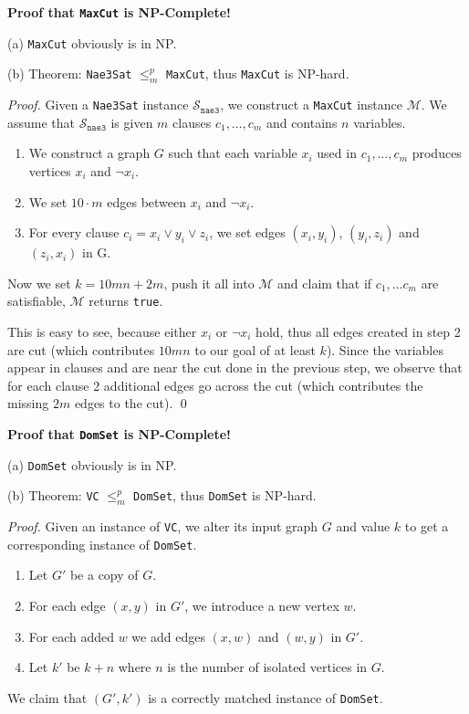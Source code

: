 \documentclass[12pt]{article}
\newcommand{\polyreduce}{$\leq_{m}^{p}$}
\begin{document}
  \textbf{Proof that \texttt{MaxCut} is NP-Complete!}

(a) \texttt{MaxCut} obviously is in NP.

(b) Theorem: \texttt{Nae3Sat} \polyreduce{} \texttt{MaxCut}, thus \texttt{MaxCut} is NP-hard.

\vspace{.3cm}
\noindent \textit{Proof.} Given a \texttt{Nae3Sat} instance $\mathcal{S}_{\texttt{nae3}}$, we construct a \texttt{MaxCut} instance $\mathcal{M}$. We assume that $\mathcal{S}_{\texttt{nae3}}$ is given $m$ clauses $c_1,\ldots, c_m$ and contains $n$ variables.
\begin{enumerate}
 \item We construct a graph $G$ such that each variable $x_i$ used in $c_1,\ldots, c_m$ produces vertices $x_i$ and $\lnot x_i$.
 \item We set $10\cdot m$ edges between $x_i$ and $\lnot x_i$.
 \item For every clause $c_i=x_i\lor y_i\lor z_i$, we set edges $(x_i, y_i)$, $(y_i, z_i)$ and $(z_i, x_i)$ in G.
\end{enumerate}
Now we set $k=10mn+2m$, push it all into $\mathcal{M}$ and claim that if $c_1,\ldots c_m$ are satisfiable, $\mathcal{M}$ returns \texttt{true}.

This is easy to see, because either $x_i$ or $\lnot x_i$ hold, thus all edges created in step 2 are cut (which contributes $10mn$ to our goal of at least $k$). Since the variables appear in clauses and are near the cut done in the previous step, we observe that for each clause 2 additional edges go across the cut (which contributes the missing $2m$ edges to the cut). \qed


  \textbf{Proof that \texttt{DomSet} is NP-Complete!}

(a) \texttt{DomSet} obviously is in NP.

(b) Theorem: \texttt{VC} \polyreduce{} \texttt{DomSet}, thus \texttt{DomSet} is NP-hard.

\vspace{.3cm}
\noindent \textit{Proof.} Given an instance of \texttt{VC}, we alter its input graph $G$ and value $k$ to get a corresponding instance of \texttt{DomSet}. \begin{enumerate}
 \item Let $G'$ be a copy of $G$.
 \item For each edge $(x,y)$ in $G'$, we introduce a new vertex $w$.
 \item For each added $w$ we add edges $(x, w)$ and $(w, y)$ in $G'$.
 \item Let $k'$ be $k+n$ where $n$ is the number of isolated vertices in $G$.
\end{enumerate}
We claim that $(G', k')$ is a correctly matched instance of \texttt{DomSet}.

 
\end{document}
